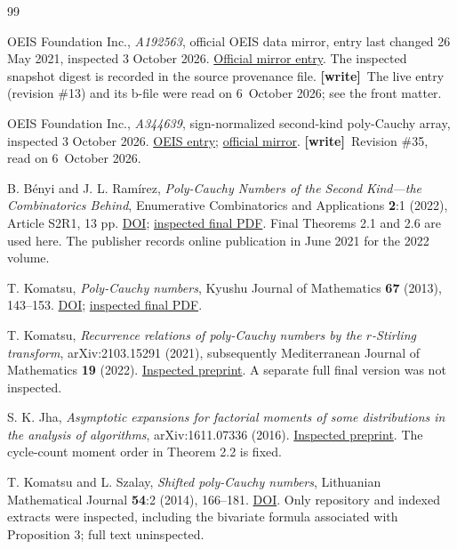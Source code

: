 \documentclass[11pt,letterpaper]{article}
\numberwithin{equation}{section}
\theoremstyle{definition}\newtheorem{definition}[theorem]{Definition}
\theoremstyle{remark}\newtheorem{remark}[theorem]{Remark}
\newcommand{\wtag}{\textup{\textbf{[write]}}}
\begin{document}
\begin{thebibliography}{99}

OEIS Foundation Inc., \emph{A192563}, official OEIS data mirror,
entry last changed 26 May 2021, inspected 3 October 2026.
\href{https://github.com/oeis/oeisdata/blob/main/seq/A192/A192563.seq}
{Official mirror entry}.
The inspected snapshot digest is recorded in the source provenance file.
\wtag\ The live entry (revision \#13) and its b-file were read on 6~October 2026; see the front matter.

OEIS Foundation Inc., \emph{A344639}, sign-normalized second-kind
poly-Cauchy array, inspected 3 October 2026.
\href{https://oeis.org/A344639}{OEIS entry};
\href{https://github.com/oeis/oeisdata/blob/main/seq/A344/A344639.seq}
{official mirror}.
\wtag\ Revision \#35, read on 6~October 2026.

B. B\'enyi and J. L. Ram\'irez,
\emph{Poly-Cauchy Numbers of the Second Kind---the Combinatorics Behind},
Enumerative Combinatorics and Applications \textbf{2}:1 (2022),
Article S2R1, 13 pp.
\href{https://doi.org/10.54550/ECA2022V2S1R1}{DOI};
\href{https://ecajournal.haifa.ac.il/Volume2022/ECA2022_S2A1.pdf}
{inspected final PDF}.
Final Theorems 2.1 and 2.6 are used here. The publisher records
online publication in June 2021 for the 2022 volume.

T. Komatsu, \emph{Poly-Cauchy numbers},
Kyushu Journal of Mathematics \textbf{67} (2013), 143--153.
\href{https://doi.org/10.2206/kyushujm.67.143}{DOI};
\href{https://www.jstage.jst.go.jp/article/kyushujm/67/1/67_143/_pdf}
{inspected final PDF}.

T. Komatsu, \emph{Recurrence relations of poly-Cauchy numbers by
the $r$-Stirling transform}, arXiv:2103.15291 (2021),
subsequently Mediterranean Journal of Mathematics \textbf{19} (2022).
\href{https://arxiv.org/abs/2103.15291}{Inspected preprint}.
A separate full final version was not inspected.

S. K. Jha, \emph{Asymptotic expansions for factorial moments of
some distributions in the analysis of algorithms},
arXiv:1611.07336 (2016).
\href{https://arxiv.org/abs/1611.07336}{Inspected preprint}.
The cycle-count moment order in Theorem 2.2 is fixed.

T. Komatsu and L. Szalay, \emph{Shifted poly-Cauchy numbers},
Lithuanian Mathematical Journal \textbf{54}:2 (2014), 166--181.
\href{https://doi.org/10.1007/s10986-014-9235-y}{DOI}.
Only repository and indexed extracts were inspected, including the
bivariate formula associated with Proposition 3; full text uninspected.


\end{thebibliography}
\end{document}
